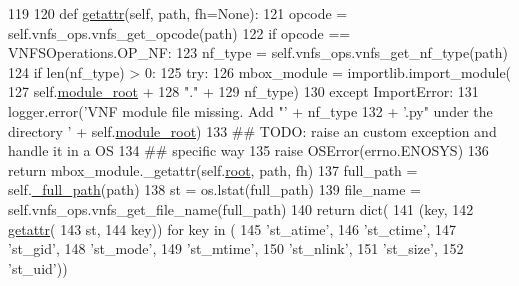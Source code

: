 \begin{DoxyCode}
119 
120     \textcolor{keyword}{def }\hyperlink{classnfio_1_1Nfio_a46d186e9d92c1fea58a01ffc08ebb5dc}{getattr}(self, path, fh=None):
121         opcode = self.vnfs\_ops.vnfs\_get\_opcode(path)
122         \textcolor{keywordflow}{if} opcode == VNFSOperations.OP\_NF:
123             nf\_type = self.vnfs\_ops.vnfs\_get\_nf\_type(path)
124             \textcolor{keywordflow}{if} len(nf\_type) > 0:
125                 \textcolor{keywordflow}{try}:
126                     mbox\_module = importlib.import\_module(
127                         self.\hyperlink{classnfio_1_1Nfio_a7f13fbcef42434fff50bbe6f3f301e83}{module\_root} +
128                         \textcolor{stringliteral}{"."} +
129                         nf\_type)
130                 \textcolor{keywordflow}{except} ImportError:
131                     logger.error(\textcolor{stringliteral}{'VNF module file missing. Add "'} + nf\_type 
132                         + \textcolor{stringliteral}{'.py" under the directory '} + self.\hyperlink{classnfio_1_1Nfio_a7f13fbcef42434fff50bbe6f3f301e83}{module\_root})
133                     \textcolor{comment}{## TODO: raise an custom exception and handle it in a OS }
134                     \textcolor{comment}{## specific way}
135                     \textcolor{keywordflow}{raise} OSError(errno.ENOSYS)
136                 \textcolor{keywordflow}{return} mbox\_module.\_getattr(self.\hyperlink{classnfio_1_1Nfio_aaebb8f6c5190c41a25e5415c56a5e6dd}{root}, path, fh)
137         full\_path = self.\hyperlink{classnfio_1_1Nfio_ab4c25ee90129e28ddc7c88ad113869de}{\_full\_path}(path)
138         st = os.lstat(full\_path)
139         file\_name = self.vnfs\_ops.vnfs\_get\_file\_name(full\_path)
140         \textcolor{keywordflow}{return} dict(
141             (key,
142              \hyperlink{classnfio_1_1Nfio_a46d186e9d92c1fea58a01ffc08ebb5dc}{getattr}(
143                  st,
144                  key)) \textcolor{keywordflow}{for} key \textcolor{keywordflow}{in} (
145                 \textcolor{stringliteral}{'st\_atime'},
146                 \textcolor{stringliteral}{'st\_ctime'},
147                 \textcolor{stringliteral}{'st\_gid'},
148                 \textcolor{stringliteral}{'st\_mode'},
149                 \textcolor{stringliteral}{'st\_mtime'},
150                 \textcolor{stringliteral}{'st\_nlink'},
151                 \textcolor{stringliteral}{'st\_size'},
152                 \textcolor{stringliteral}{'st\_uid'}))

\end{DoxyCode}
